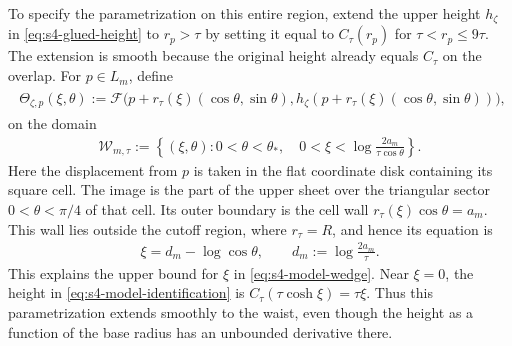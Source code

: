 \documentclass[a4paper,11pt,oneside,reqno]{amsart}
\numberwithin{equation}{section}
\theoremstyle{definition}
\begin{document}
To specify the parametrization on this entire region,
extend the upper height $h_\zeta$ in
\eqref{eq:s4-glued-height} to $r_p>\tau$ by setting it
equal to $C_\tau(r_p)$ for $\tau<r_p\leq9\tau$.
The extension is smooth because the original height
already equals $C_\tau$ on the overlap. For
$p\in L_m$, define
%
\begin{align}
    \label{eq:s4-model-identification}
    \begin{split}
        \Theta_{\zeta,p}(\xi,\theta)
        :=\mathcal F\bigl(p+r_\tau(\xi)
                       (\cos\theta,\sin\theta),
                    h_\zeta(p+r_\tau(\xi)
                       (\cos\theta,\sin\theta))\bigr),
    \end{split}
\end{align}
%
on the domain
%
\begin{align}
    \label{eq:s4-model-wedge}
    \mathcal W_{m,\tau}
    :=\left\{(\xi,\theta):
       0<\theta<\theta_*,\quad
       0<\xi<\log\frac{2a_m}{\tau\cos\theta}
      \right\}.
\end{align}
%
Here the displacement from $p$ is taken in the flat
coordinate disk containing its square cell. The image
is the part of the upper sheet over the triangular
sector $0<\theta<\pi/4$ of that cell. Its outer boundary
is the cell wall
$r_\tau(\xi)\cos\theta=a_m$. This wall lies outside
the cutoff region, where $r_\tau=R$, and hence its
equation is
%
\begin{align*}
    \xi=d_m-\log\cos\theta,
    \qquad d_m:=\log\frac{2a_m}{\tau}.
\end{align*}
%
This explains the upper bound for $\xi$ in
\eqref{eq:s4-model-wedge}.
Near $\xi=0$, the height in
\eqref{eq:s4-model-identification} is
$C_\tau(\tau\cosh\xi)=\tau\xi$. Thus this
parametrization extends smoothly to the waist,
even though the height as a function of the base
radius has an unbounded derivative there.
\end{document}
